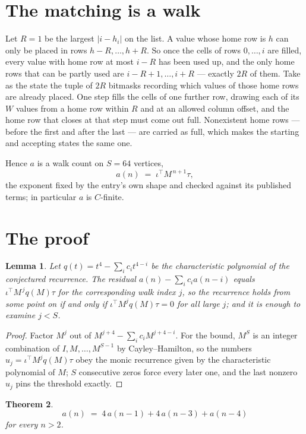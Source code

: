 \documentclass[11pt,a4paper]{article}
\theoremstyle{plain}
\newtheorem{theorem}{Theorem}
\newtheorem{lemma}[theorem]{Lemma}
\theoremstyle{definition}
\begin{document}
\section{The matching is a walk}

Let $R=1$ be the largest $|i-h_i|$ on the list. A value whose home row is $h$ can only be
placed in rows $h-R,\dots,h+R$. So once the cells of rows $0,\dots,i$ are filled, every
value with home row at most $i-R$ has been used up, and the only home rows that can be
partly used are $i-R+1,\dots,i+R$ --- exactly $2R$ of them. Take as the state the tuple of
$2R$ bitmasks recording which values of those home rows are already placed. One step fills
the cells of one further row, drawing each of its $W$ values from a home row within $R$
and at an allowed column offset, and the home row that closes at that step must come out
full. Nonexistent home rows --- before the first and after the last --- are carried as
full, which makes the starting and accepting states the same one.

Hence $a$ is a walk count on $S=64$ vertices,
\[
a(n)\;=\;\iota^{\!\top}M^{\,n+1}\tau ,
\]
the exponent fixed by the entry's own shape and checked against its published terms; in
particular $a$ is $C$-finite.

\section{The proof}

\begin{lemma}\label{lem:crit}
Let $q(t)=t^{4}-\sum_i c_it^{4-i}$ be the characteristic polynomial of the
conjectured recurrence. The residual $a(n)-\sum_ic_ia(n-i)$ equals
$\iota^{\!\top}M^{\,j}q(M)\tau$ for the corresponding walk index $j$, so the recurrence
holds from some point on if and only if $\iota^{\!\top}M^{j}q(M)\tau=0$ for all large $j$;
and it is enough to examine $j<S$.
\end{lemma}

\begin{proof}
Factor $M^{j}$ out of $M^{j+4}-\sum_ic_iM^{j+4-i}$. For the bound, $M^{S}$
is an integer combination of $I,M,\dots,M^{S-1}$ by Cayley--Hamilton, so the numbers
$u_j=\iota^{\!\top}M^{j}q(M)\tau$ obey the monic recurrence given by the characteristic
polynomial of $M$; $S$ consecutive zeros force every later one, and the last nonzero $u_j$
pins the threshold exactly.
\end{proof}

\begin{theorem}
\[
a(n)\;=\;4\,a(n-1) + 4\,a(n-3) + a(n-4)
\]
for every $n>2$.
\end{theorem}
\end{document}
